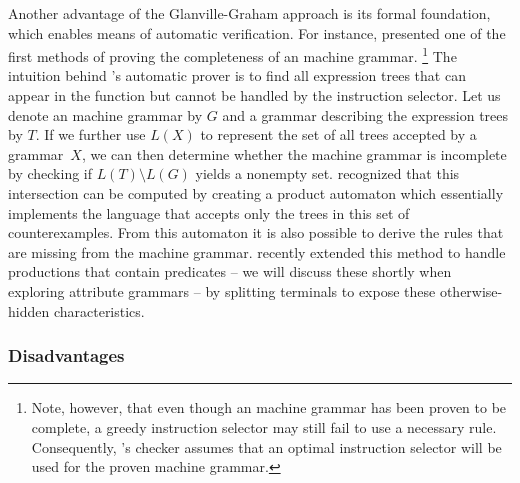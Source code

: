Another advantage of the \gls{Glanville-Graham approach} is its formal
foundation, which enables means of automatic verification.
%
For instance, \textcite{Emmelmann:1992:Testing} presented one of the first
methods of proving the completeness of an \gls{machine grammar}.\!%
%
\footnote{%
  Note, however, that even though an \gls{machine grammar} has been proven to be
  complete, a greedy \gls{instruction selector} may still fail to use a
  necessary \gls{rule}.
  Consequently, \citeauthor{Emmelmann:1992:Testing}'s checker assumes that an
  optimal \gls{instruction selector} will be used for the proven \gls{machine
    grammar}.%
}
%
The intuition behind \citeauthor{Emmelmann:1992:Testing}'s automatic prover is
to find all \glspl{expression tree} that can appear in the \gls{function} but
cannot be handled by the \gls{instruction selector}.
%
Let us denote an \gls{machine grammar} by $G$ and a \gls{grammar} describing the
\glspl{expression tree} by $T$.
%
If we further use $L(X)$ to represent the set of all \glspl{tree} accepted by a
\gls{grammar}~$X$, we can then determine whether the \gls{machine grammar} is
incomplete by checking if $L(T) \setminus L(G)$ yields a nonempty set.
%
\citeauthor{Emmelmann:1992:Testing} recognized that this intersection can be
computed by creating a \gls{product automaton} which essentially implements the
language that accepts only the \glspl{tree} in this set of counterexamples.
%
From this automaton it is also possible to derive the \glspl{rule} that are
missing from the \gls{machine grammar}.
%
\textcite{BrandnerEtAl:2010} recently extended this method to handle
\glspl{production} that contain \glspl{predicate} -- we will discuss these
shortly when exploring \glspl{attribute grammar} -- by splitting
\glspl{terminal} to expose these otherwise-hidden characteristics.


\subsubsection{Disadvantages}

